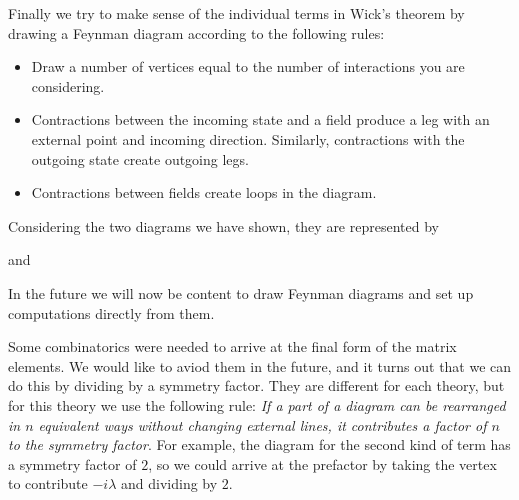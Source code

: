Finally we try to make sense of the individual terms in Wick's theorem by drawing a Feynman diagram according to the following rules:
\begin{itemize}
	\item Draw a number of vertices equal to the number of interactions you are considering.
	\item Contractions between the incoming state and a field produce a leg with an external point and incoming direction. Similarly, contractions with the outgoing state create outgoing legs.
	\item Contractions between fields create loops in the diagram.
\end{itemize}
Considering the two diagrams we have shown, they are represented by
\begin{center}
	
\end{center}
and
\begin{center}
\end{center}
In the future we will now be content to draw Feynman diagrams and set up computations directly from them.

Some combinatorics were needed to arrive at the final form of the matrix elements. We would like to aviod them in the future, and it turns out that we can do this by dividing by a symmetry factor. They are different for each theory, but for this theory we use the following rule: \textit{If a part of a diagram can be rearranged in $n$ equivalent ways without changing external lines, it contributes a factor of $n$ to the symmetry factor}. For example, the diagram for the second kind of term has a symmetry factor of $2$, so we could arrive at the prefactor by taking the vertex to contribute $-i\lambda$ and dividing by $2$.

